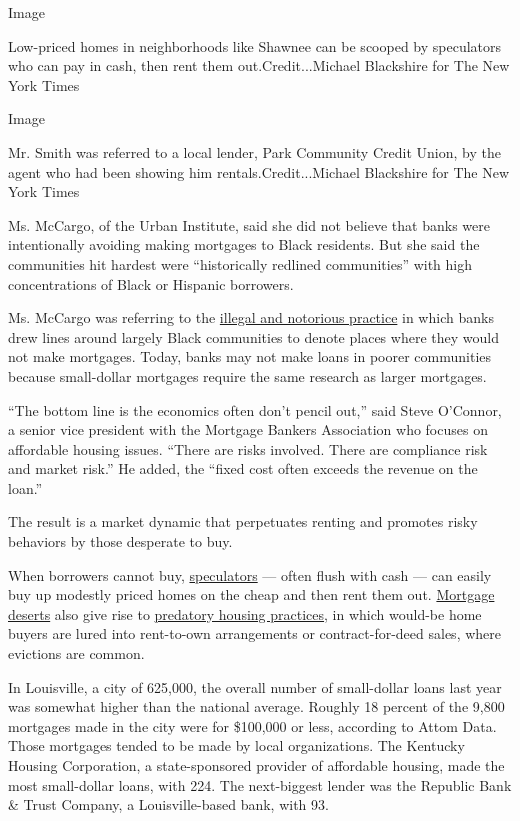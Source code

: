 Image

Low-priced homes in neighborhoods like Shawnee can be scooped by
speculators who can pay in cash, then rent them out.Credit...Michael
Blackshire for The New York Times

Image

Mr. Smith was referred to a local lender, Park Community Credit Union,
by the agent who had been showing him rentals.Credit...Michael
Blackshire for The New York Times

Ms. McCargo, of the Urban Institute, said she did not believe that banks
were intentionally avoiding making mortgages to Black residents. But she
said the communities hit hardest were ``historically redlined
communities'' with high concentrations of Black or Hispanic borrowers.

Ms. McCargo was referring to the
\href{https://www.nytimes3xbfgragh.onion/2017/08/24/upshot/how-redlinings-racist-effects-lasted-for-decades.html}{illegal
and notorious practice} in which banks drew lines around largely Black
communities to denote places where they would not make mortgages. Today,
banks may not make loans in poorer communities because small-dollar
mortgages require the same research as larger mortgages.

``The bottom line is the economics often don't pencil out,'' said Steve
O'Connor, a senior vice president with the Mortgage Bankers Association
who focuses on affordable housing issues. ``There are risks involved.
There are compliance risk and market risk.'' He added, the ``fixed cost
often exceeds the revenue on the loan.''

The result is a market dynamic that perpetuates renting and promotes
risky behaviors by those desperate to buy.

When borrowers cannot buy,
\href{https://www.nytimes3xbfgragh.onion/2019/03/25/business/fox-news-clayton-morris-indianapolis.html}{speculators}
--- often flush with cash --- can easily buy up modestly priced homes on
the cheap and then rent them out.
\href{https://www.nytimes3xbfgragh.onion/2017/11/04/business/detroit-housing.html}{Mortgage
deserts} also give rise to
\href{https://www.nytimes3xbfgragh.onion/series/the-housing-trap}{predatory
housing practices}, in which would-be home buyers are lured into
rent-to-own arrangements or contract-for-deed sales, where evictions are
common.

In Louisville, a city of 625,000, the overall number of small-dollar
loans last year was somewhat higher than the national average. Roughly
18 percent of the 9,800 mortgages made in the city were for \$100,000 or
less, according to Attom Data. Those mortgages tended to be made by
local organizations. The Kentucky Housing Corporation, a state-sponsored
provider of affordable housing, made the most small-dollar loans, with
224. The next-biggest lender was the Republic Bank \& Trust Company, a
Louisville-based bank, with 93.

